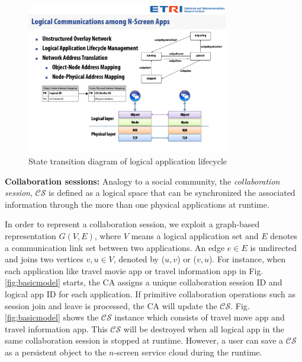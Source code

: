 \documentclass[conference]{IEEEtran}
\begin{document}
    \begin{figure}[htb] %
    \centering
    \includegraphics[width=8.8cm,keepaspectratio]{lifecycle}
    \caption{State transition diagram of logical application lifecycle}
    \label{fig:logicalapp}
    \end{figure}

\noindent
\textbf{Collaboration sessions: }
Analogy to a social community, the \textit{collaboration session}, $\mathcal{CS}$ is defined as a logical space  that can be synchronized the associated information through the more than one physical applications at runtime.

In order to represent a collaboration session, we exploit a graph-based representation $G(V, E)$, where $V$ means a logical application set and $E$ denotes a communication link set between two applications. An edge $e \in E$ is undirected and joins two vertices $v, u \in V$, denoted by ($u, v$) or ($v, u$). 
For instance, 
when each application like travel movie app or travel information app in Fig. \ref{fig:basicmodel} starts, the CA assigns a unique collaboration session ID and logical app ID for each application. If primitive collaboration operations such as session join and leave is processed, the CA will update the $\mathcal{CS}$. Fig. \ref{fig:basicmodel} shows the  $\mathcal{CS}$ instance which consists of travel move app and travel information app. This $\mathcal{CS}$ will be destroyed when all logical app in the same collaboration session is stopped at runtime. However, a user can save a $\mathcal{CS}$ as a persistent object to the $n$-screen service cloud during the runtime.\\
\end{document}
